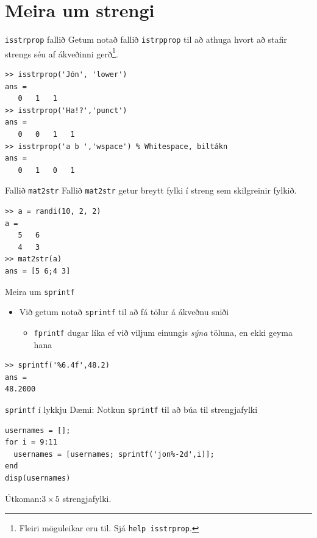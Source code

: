 \documentclass[handout]{beamer}
\begin{document}
\section{Meira um strengi}

\begin{frame}[fragile]{\texttt{isstrprop} fallið}
\vspace{1.5\baselineskip}
Getum notað fallið \texttt{istrpprop} til að athuga hvort að stafir strengs séu af ákveðinni gerð\footnote{Fleiri möguleikar eru til. Sjá \texttt{help isstrprop}.}.
\begin{verbatim}
>> isstrprop('Jón', 'lower')
ans =
   0   1   1
>> isstrprop('Ha!?','punct')
ans =
   0   0   1   1
>> isstrprop('a b ','wspace') % Whitespace, biltákn
ans =
   0   1   0   1
\end{verbatim}
\end{frame}

\begin{frame}[fragile]{Fallið \texttt{mat2str}}
Fallið \texttt{mat2str} getur breytt fylki í streng sem skilgreinir fylkið.
\begin{verbatim}
>> a = randi(10, 2, 2)
a =
   5   6
   4   3
>> mat2str(a)
ans = [5 6;4 3]
\end{verbatim}
\end{frame}

\begin{frame}[fragile]{Meira um \texttt{sprintf}}
\begin{itemize}
 \item Við getum notað \texttt{sprintf} til að fá tölur á ákveðnu sniði
 \begin{itemize}
  \item \texttt{fprintf} dugar líka ef við viljum einungis \emph{sýna} töluna, en ekki geyma hana
 \end{itemize}
\end{itemize}
\begin{verbatim}
>> sprintf('%6.4f',48.2)
ans =
48.2000
\end{verbatim}
\end{frame}

\begin{frame}[fragile]{\texttt{sprintf} í lykkju}
Dæmi: Notkun \texttt{sprintf} til að búa til strengjafylki

\begin{verbatim}
usernames = [];
for i = 9:11
  usernames = [usernames; sprintf('jon%-2d',i)];
end
disp(usernames)
\end{verbatim}
Útkoman:\pause $3\times 5$ strengjafylki.
\end{frame}
\end{document}
